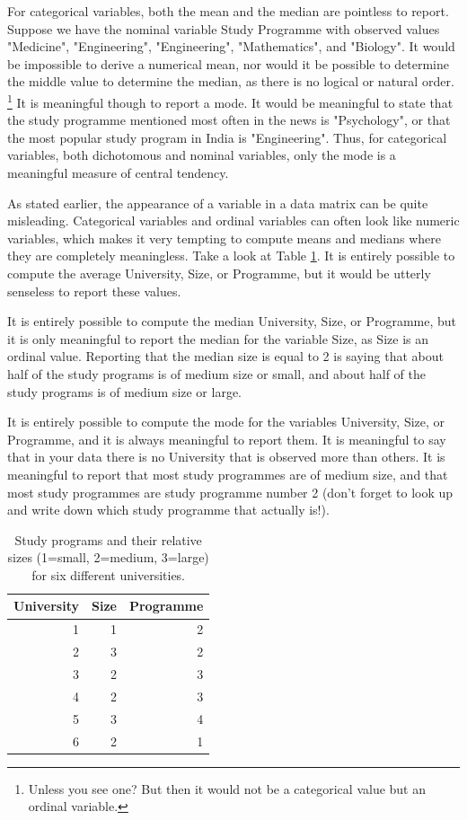 \documentclass[]{report}\usepackage[]{graphicx}\usepackage[]{color}
\begin{document}
For categorical variables, both the mean and the median are pointless to report. Suppose we have the nominal variable Study Programme with observed values "Medicine", "Engineering", "Engineering", "Mathematics", and "Biology". It would be impossible to derive a numerical mean, nor would it be possible to determine the middle value to determine the median, as there is no logical or natural order. \footnote{Unless you see one? But then it would not be a categorical value but an ordinal variable.} It is meaningful though to report a mode. It would be meaningful to state that the study programme mentioned most often in the news is "Psychology", or that the most popular study program in India is "Engineering". Thus, for categorical variables, both dichotomous and nominal variables, only the mode is a meaningful measure of central tendency.

As stated earlier, the appearance of a variable in a data matrix can be quite misleading. Categorical variables and ordinal variables can often look like numeric variables, which makes it very tempting to compute means and medians where they are completely meaningless. Take a look at Table \ref{tab:modemedian}. It is entirely possible to compute the average University, Size, or Programme, but it would be utterly senseless to report these values.

It is entirely possible to compute the median University, Size, or Programme, but it is only meaningful to report the median for the variable Size, as Size is an ordinal value. Reporting that the median size is equal to 2 is saying that about half of the study programs is of medium size or small, and about half of the study programs is of medium size or large.

It is entirely possible to compute the mode for the variables University, Size, or Programme, and it is always meaningful to report them. It is meaningful to say that in your data there is no University that is observed more than others. It is meaningful to report that most study programmes are of medium size, and that most study programmes are study programme number 2 (don't forget to look up and write down which study programme that actually is!).



\begin{table}[ht]
\centering
\caption{Study programs and their relative sizes (1=small, 2=medium, 3=large) for six different universities.} 
\label{tab:modemedian}
\begin{tabular}{rrr}
  \hline
University & Size & Programme \\ 
  \hline
1 & 1 & 2 \\ 
  2 & 3 & 2 \\ 
  3 & 2 & 3 \\ 
  4 & 2 & 3 \\ 
  5 & 3 & 4 \\ 
  6 & 2 & 1 \\ 
   \hline
\end{tabular}
\end{table}
\end{document}
